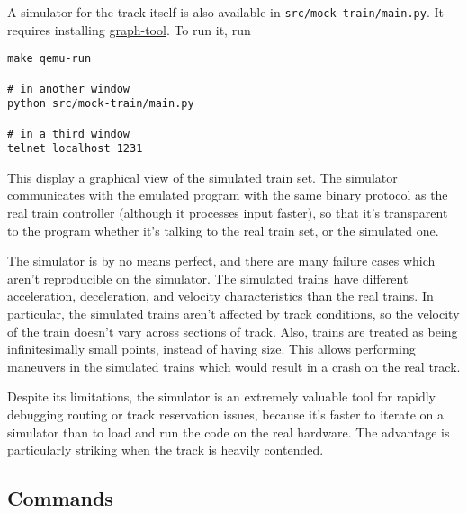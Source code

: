 A simulator for the track itself is also available in
\texttt{src/mock-train/main.py}. It requires installing
\href{https://graph-tool.skewed.de/}{graph-tool}. To run it, run

\begin{verbatim}
make qemu-run

# in another window
python src/mock-train/main.py

# in a third window
telnet localhost 1231
\end{verbatim}

This display a graphical view of the simulated train set. The simulator
communicates with the emulated program with the same binary protocol as
the real train controller (although it processes input faster), so that
it's transparent to the program whether it's talking to the real train
set, or the simulated one.

The simulator is by no means perfect, and there are many failure cases
which aren't reproducible on the simulator. The simulated trains have
different acceleration, deceleration, and velocity characteristics than
the real trains. In particular, the simulated trains aren't affected by
track conditions, so the velocity of the train doesn't vary across
sections of track. Also, trains are treated as being infinitesimally
small points, instead of having size. This allows performing maneuvers
in the simulated trains which would result in a crash on the real track.

Despite its limitations, the simulator is an extremely valuable tool for
rapidly debugging routing or track reservation issues, because it's
faster to iterate on a simulator than to load and run the code on the
real hardware. The advantage is particularly striking when the track is
heavily contended.

\subsection{Commands}\label{commands}

